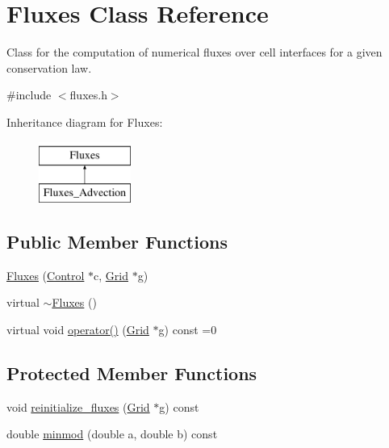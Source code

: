 \hypertarget{class_fluxes}{}\section{Fluxes Class Reference}
\label{class_fluxes}


Class for the computation of numerical fluxes over cell interfaces for a given conservation law.  




{\ttfamily \#include $<$fluxes.\+h$>$}

Inheritance diagram for Fluxes\+:\begin{figure}[H]
\begin{center}
\leavevmode
\includegraphics[height=2.000000cm]{class_fluxes}
\end{center}
\end{figure}
\subsection*{Public Member Functions}
\begin{DoxyCompactItemize}
\item 
\hyperlink{class_fluxes_accfbcaf73689eb08bee2b799cc981dcf}{Fluxes} (\hyperlink{class_control}{Control} $\ast$c, \hyperlink{class_grid}{Grid} $\ast$g)
\item 
virtual \hyperlink{class_fluxes_a18143f941adeeaf901f39e10b0c7a8f7}{$\sim$\+Fluxes} ()
\item 
virtual void \hyperlink{class_fluxes_ad3c2d7326f428cf6543e5ef374aa1b90}{operator()} (\hyperlink{class_grid}{Grid} $\ast$g) const =0
\end{DoxyCompactItemize}
\subsection*{Protected Member Functions}
\begin{DoxyCompactItemize}
\item 
void \hyperlink{class_fluxes_aed960cd3e402e665449ffccd33f448d1}{reinitialize\+\_\+fluxes} (\hyperlink{class_grid}{Grid} $\ast$g) const 
\item 
double \hyperlink{class_fluxes_ae159dd9fd9431e6ddcdeef7d04090a9f}{minmod} (double a, double b) const 
\end{DoxyCompactItemize}
